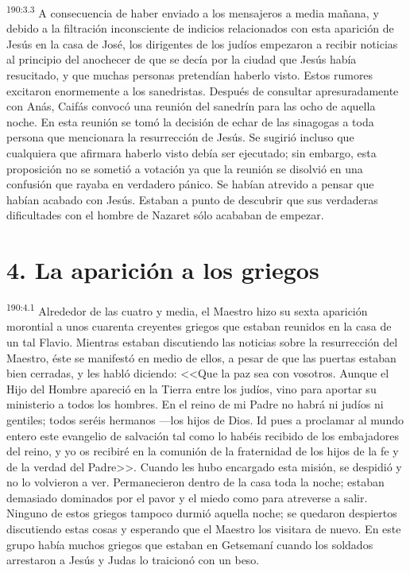 \par 
\textsuperscript{190:3.3} A consecuencia de haber enviado a los mensajeros a media mañana, y debido a la filtración inconsciente de indicios relacionados con esta aparición de Jesús en la casa de José, los dirigentes de los judíos empezaron a recibir noticias al principio del anochecer de que se decía por la ciudad que Jesús había resucitado, y que muchas personas pretendían haberlo visto. Estos rumores excitaron enormemente a los sanedristas. Después de consultar apresuradamente con Anás, Caifás convocó una reunión del sanedrín para las ocho de aquella noche. En esta reunión se tomó la decisión de echar de las sinagogas a toda persona que mencionara la resurrección de Jesús. Se sugirió incluso que cualquiera que afirmara haberlo visto debía ser ejecutado; sin embargo, esta proposición no se sometió a votación ya que la reunión se disolvió en una confusión que rayaba en verdadero pánico. Se habían atrevido a pensar que habían acabado con Jesús. Estaban a punto de descubrir que sus verdaderas dificultades con el hombre de Nazaret sólo acababan de empezar.

\section*{4. La aparición a los griegos}
\par 
\textsuperscript{190:4.1} Alrededor de las cuatro y media, el Maestro hizo su sexta aparición morontial a unos cuarenta creyentes griegos que estaban reunidos en la casa de un tal Flavio. Mientras estaban discutiendo las noticias sobre la resurrección del Maestro, éste se manifestó en medio de ellos, a pesar de que las puertas estaban bien cerradas, y les habló diciendo: <<Que la paz sea con vosotros. Aunque el Hijo del Hombre apareció en la Tierra entre los judíos, vino para aportar su ministerio a todos los hombres. En el reino de mi Padre no habrá ni judíos ni gentiles; todos seréis hermanos ---los hijos de Dios. Id pues a proclamar al mundo entero este evangelio de salvación tal como lo habéis recibido de los embajadores del reino, y yo os recibiré en la comunión de la fraternidad de los hijos de la fe y de la verdad del Padre>>. Cuando les hubo encargado esta misión, se despidió y no lo volvieron a ver. Permanecieron dentro de la casa toda la noche; estaban demasiado dominados por el pavor y el miedo como para atreverse a salir. Ninguno de estos griegos tampoco durmió aquella noche; se quedaron despiertos discutiendo estas cosas y esperando que el Maestro los visitara de nuevo. En este grupo había muchos griegos que estaban en Getsemaní cuando los soldados arrestaron a Jesús y Judas lo traicionó con un beso.

